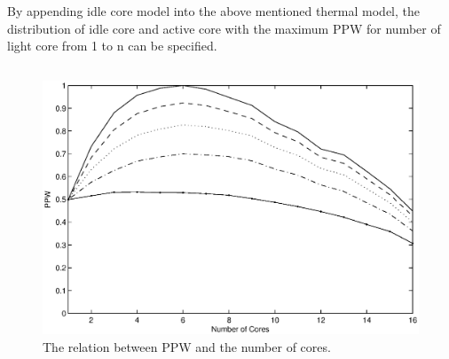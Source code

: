 By appending idle core model into the above mentioned thermal model, the distribution of idle
core and active core with the maximum PPW for number of light core from 1 to n can be specified.

\subsection{}

\begin{figure}
\centering
\includegraphics[width=1\columnwidth]{fig/ppw_alpha_ratio.eps}
\caption{The relation between PPW and the number of cores.
}
\label{fig:ppw_alpha_ratio}
\end{figure}